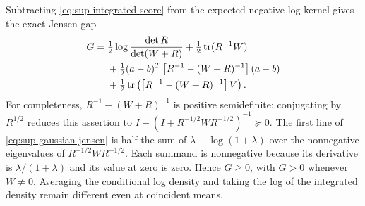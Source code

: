 Subtracting \cref{eq:sup-integrated-score} from the expected negative log kernel gives the exact Jensen gap
\begin{equation}
 \begin{aligned}
 G={}&\tfrac12\log\frac{\det R}{\det(W+R)}
      +\tfrac12\operatorname{tr}(R^{-1}W)\\
 &+\tfrac12(a-b)^T\left[R^{-1}-(W+R)^{-1}\right](a-b)\\
 &+\tfrac12\operatorname{tr}\left(\left[R^{-1}-(W+R)^{-1}\right]V\right).
 \end{aligned}
 \label{eq:sup-gaussian-jensen}
\end{equation}
For completeness, $R^{-1}-(W+R)^{-1}$ is positive semidefinite: conjugating by $R^{1/2}$ reduces this assertion to $I-(I+R^{-1/2}WR^{-1/2})^{-1}\succeq0$. The first line of \cref{eq:sup-gaussian-jensen} is half the sum of $\lambda-\log(1+\lambda)$ over the nonnegative eigenvalues of $R^{-1/2}WR^{-1/2}$. Each summand is nonnegative because its derivative is $\lambda/(1+\lambda)$ and its value at zero is zero. Hence $G\geq0$, with $G>0$ whenever $W\neq0$. Averaging the conditional log density and taking the log of the integrated density remain different even at coincident means.
